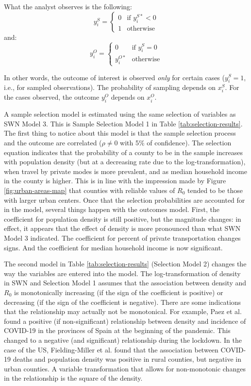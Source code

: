 \documentclass[preprint, 3p,
authoryear]{elsarticle} %
\begin{document}
What the analyst observes is the following: \[
y_i^S =
\begin{cases}
0 & \text{if } y_i^{S*} < 0\\
1 & \text{otherwise}
\end{cases}
\] \noindent and: \[
y_i^O =
\begin{cases}
0 & \text{if } y_i^{S} = 0\\
y_i^{O*} & \text{otherwise}
\end{cases}
\]

In other words, the outcome of interest is observed \emph{only} for
certain cases (\(y_i^S=1\), i.e., for sampled observations). The
probability of sampling depends on \(x_i^S\). For the cases observed,
the outcome \(y_i^O\) depends on \(x_i^O\).

A sample selection model is estimated using the same selection of
variables as SWN Model 3. This is Sample Selection Model 1 in Table
\ref{tab:selection-results}. The first thing to notice about this model
is that the sample selection process and the outcome are correlated
(\(\rho\ne0\) with 5\% of confidence). The selection equation indicates
that the probability of a county to be in the sample increases with
population density (but at a decreasing rate due to the
log-transformation), when travel by private modes is more prevalent, and
as median household income in the county is higher. This is in line with
the impression made by Figure \ref{fig:urban-areas-map} that counties
with reliable values of \(R_0\) tended to be those with larger urban
centers. Once that the selection probabilities are accounted for in the
model, several things happen with the outcomes model. First, the
coefficient for population density is still positive, but the magnitude
changes: in effect, it appears that the effect of density is more
pronounced than what SWN Model 3 indicated. The coefficient for percent
of private transportation changes signs. And the coefficient for median
household income is now significant.

The second model in Table \ref{tab:selection-results} (Selection Model
2) changes the way the variables are entered into the model. The
log-transformation of density in SWN and Selection Model 1 assumes that
the association between density and \(R_0\) is monotonically increasing
(if the sign of the coefficient is positive) or decreasing (if the sign
of the coefficient is negative). There are some indications that the
relationship may actually not be monotonical. For example, Paez et al.
\citeyearpar{Paez2020spatio} found a positive (if non-significant)
relationship between density and incidence of COVID-19 in the provinces
of Spain at the beginning of the pandemic. This changed to a negative
(and significant) relationship during the lockdown. In the case of the
US, Fielding-Miller et al. \citeyearpar{Fielding2020social} found that
the association between COVID-19 deaths and population density was
positive in rural counties, but negative in urban counties. A variable
transformation that allows for non-monotonic changes in the relationship
is the square of the density.
\end{document}
